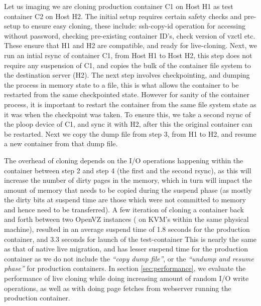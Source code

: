 Let us imaging we are cloning production container C1 on Host H1 as test container C2 on Host H2. 
The initial setup requires certain safety checks and pre-setup to ensure easy cloning, these include: ssh-copy-id operation for accessing without password, checking pre-existing container ID's, check version of vzctl etc. 
These ensure that H1 and H2 are compatible, and ready for live-cloning.
Next, we run an intial rsync of container C1, from Host H1 to Host H2, this step does not require any suspension of C1, and copies the bulk of the container file system to the destination server (H2). 
The next step involves checkpointing, and dumping the process in memory state to a file, this is what allows the container to be restarted from the same checkpointed state. 
However for sanity of the container process, it is important to restart the container from the same file system state as it was when the checkpoint was taken.
To ensure this, we take a second rsync of the ploop device of C1, and sync it with H2, after this the original container can be restarted.
Next we copy the dump file from step 3, from H1 to H2, and resume a new container from that dump file.

The overhead of cloning depends on the I/O operations happening within the container between step 2 and step 4 (the first and the second rsync), as this will increase the number of dirty pages in the memory, which in turn will impact the amount of memory that needs to be copied during the suspend phase (as mostly the dirty bits at suspend time are those which were not committed to memory and hence need to be transferred).  
A few iteration of cloning a container back and forth between two OpenVZ instances ( on KVM's within the same physical machine), resulted in an average suspend time of 1.8 seconds for the production container, and 3.3 seconds for launch of the test-container
This is nearly the same as that of native live migration\cite{openvzLiveMigrationPerf}, and has lesser suspend time for the production container as we do not include the \textit{``copy dump file''}, or the \textit{``undump and resume phase''} for production containers. 
In section \ref{sec:performance}, we evaluate the performance of live cloning while doing increasing amount of random I/O write operations, as well as with doing page fetches  from webserver running the production container.


